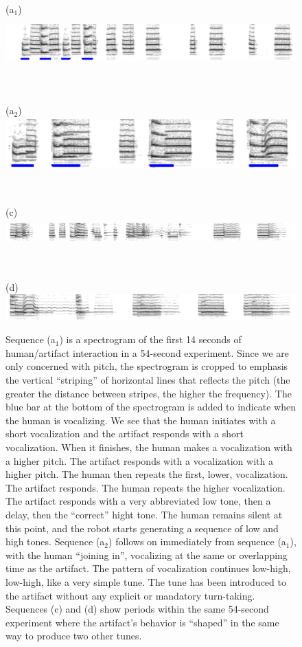 \begin{figure}[p]

\centerline{(a$_1$) \includegraphics[height=2cm]{images/chico-separate-begin-labelled}}

\ \\

\centerline{(a$_2$) \includegraphics[height=2cm]{images/chico-separate-together-labelled}}

\ \\

\centerline{(c) \includegraphics[height=1cm]{images/chico-pair}}

\ \\

\centerline{(d) \includegraphics[height=1cm]{images/chico-ohm}}


\caption{
%
\label{fig:sing-spectrogram}
%
Sequence (a$_1$) is a spectrogram of the first 14 seconds of human/artifact 
interaction in a 54-second experiment. 
Since we are only concerned with pitch, the 
spectrogram is cropped to emphasis the vertical ``striping'' of 
horizontal lines that reflects the pitch (the greater 
the distance between stripes, the higher the frequency).
The blue bar at the bottom of the spectrogram is added to 
indicate when the human is vocalizing.
%
We see that the human initiates with a short vocalization
and the artifact responds with a short vocalization.  When it
finishes, the human makes a vocalization with a higher pitch.
The artifact responds with a vocalization with a higher pitch.
The human then repeats the first, lower, vocalization.
The artifact responds.  The human repeats the higher vocalization.
The artifact responds with a very abbreviated low tone, then a delay,
then the ``correct'' hight tone.  The human remains silent at this
point, and the robot starts generating a sequence of low and high
tones.
%
Sequence (a$_2$) follows on immediately from sequence (a$_1$), with 
the human ``joining in'', vocalizing at the same or overlapping time 
as the artifact.  The pattern of vocalization continues low-high,
low-high, like a very simple tune.
%
The tune has been introduced to the artifact without any
explicit or mandatory turn-taking.
%
Sequences (c) and (d) show periods within the same 54-second experiment
where the artifact's behavior is ``shaped'' in the same way
to produce two other tunes.
}

\end{figure}




